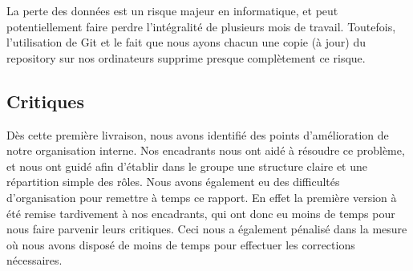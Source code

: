 	    La perte des données est un risque majeur en informatique, et peut potentiellement faire perdre l'intégralité de plusieurs mois de travail. Toutefois, l'utilisation de Git et le fait que nous ayons chacun une copie (à jour) du repository sur nos ordinateurs supprime presque complètement ce risque.

	\subsection{Critiques}
		Dès cette première livraison, nous avons identifié des points d'amélioration de notre organisation interne. Nos encadrants nous ont aidé à résoudre ce problème, et nous ont guidé afin d'établir dans le groupe une structure claire et une répartition simple des rôles.
		Nous avons également eu des difficultés d'organisation pour remettre à temps ce rapport. En effet la première version à été remise tardivement à nos encadrants, qui ont donc eu moins de temps pour nous faire parvenir leurs critiques. Ceci nous a également pénalisé dans la mesure où nous avons disposé de moins de temps pour effectuer les corrections nécessaires. 